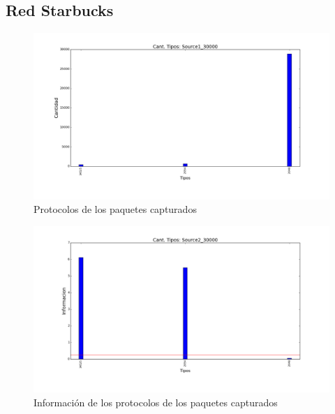 \subsection{Red Starbucks}

\begin{figure}[H]
       \centering
       \includegraphics[width=1\textwidth]{../resultados/Starbucks/histogram_types.png}
       \caption{Protocolos de los paquetes capturados}
       \label{red-Starbucks-types}
\end{figure}

\begin{figure}[H]
       \centering
       \includegraphics[width=1\textwidth]{../resultados/Starbucks/histogram_types_information.png}
       \caption{Información de los protocolos de los paquetes capturados}
       \label{red-Starbucks-types-information}
\end{figure}


